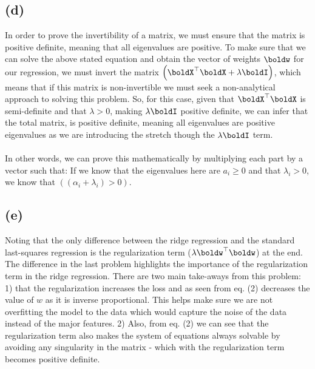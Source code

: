 \documentclass[submit]{harvardml}
\begin{document}
\subsection*{(d)}
In order to prove the invertibility of a matrix, we must ensure that the matrix is positive definite, meaning that all eigenvalues are positive. To make sure that we can solve the above stated equation and obtain the vector of weights $\boldw$ for our regression, we must invert the matrix $\left(    {\boldX^\top\boldX} + {\lambda\boldI}\right)$, which means that if this matrix is non-invertible we must seek a non-analytical approach to solving this problem. So, for this case, given that ${\boldX^\top\boldX} $ is semi-definite and that $\lambda>0$, making $\lambda\boldI$ positive definite, we can infer that the total matrix, is positive definite, meaning all eigenvalues are positive eigenvalues as we are introducing the stretch though the $\lambda\boldI$ term.
\\ \\
\noindent In other words, we can prove this mathematically by multiplying each part by a vector such that:
If we know that the eigenvalues here are $a_i\geq0$ and that $\lambda_i>0$, we know that $((\alpha_i+\lambda_i)>0)$.\\
\endproof


\subsection*{(e)}
Noting that the only difference between the ridge regression and the standard last-squares regression is the regularization term ($\lambda\boldw^\top\boldw$) at the end. The difference in the last problem highlights the importance of the regularization term in the ridge regression. There are two main take-aways from this problem: 1) that the regularization increases the loss and as seen from eq. (2) decreases the value of $w$ as it is inverse proportional. This helps make sure we are not overfitting the model to the data which would capture the noise of the data instead of the major features. 2) Also, from eq. (2) we can see that the regularization term also makes the system of equations always solvable by avoiding any singularity in the matrix - which with the regularization term becomes positive definite.
\end{document}
